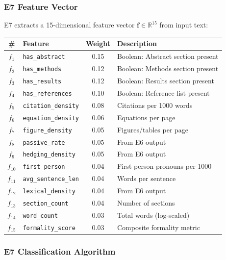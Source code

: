 \subsubsection{E7 Feature Vector}

E7 extracts a 15-dimensional feature vector $\mathbf{f} \in \mathbb{R}^{15}$ from input text:

\begin{center}
\begin{tabular}{clcl}
\toprule
\# & Feature & Weight & Description \\
\midrule
$f_1$ & \texttt{has\_abstract} & 0.15 & Boolean: Abstract section present \\
$f_2$ & \texttt{has\_methods} & 0.12 & Boolean: Methods section present \\
$f_3$ & \texttt{has\_results} & 0.12 & Boolean: Results section present \\
$f_4$ & \texttt{has\_references} & 0.10 & Boolean: Reference list present \\
$f_5$ & \texttt{citation\_density} & 0.08 & Citations per 1000 words \\
$f_6$ & \texttt{equation\_density} & 0.06 & Equations per page \\
$f_7$ & \texttt{figure\_density} & 0.05 & Figures/tables per page \\
$f_8$ & \texttt{passive\_rate} & 0.05 & From E6 output \\
$f_9$ & \texttt{hedging\_density} & 0.05 & From E6 output \\
$f_{10}$ & \texttt{first\_person} & 0.04 & First person pronouns per 1000 \\
$f_{11}$ & \texttt{avg\_sentence\_len} & 0.04 & Words per sentence \\
$f_{12}$ & \texttt{lexical\_density} & 0.04 & From E6 output \\
$f_{13}$ & \texttt{section\_count} & 0.04 & Number of sections \\
$f_{14}$ & \texttt{word\_count} & 0.03 & Total words (log-scaled) \\
$f_{15}$ & \texttt{formality\_score} & 0.03 & Composite formality metric \\
\bottomrule
\end{tabular}
\end{center}

\subsubsection{E7 Classification Algorithm}

